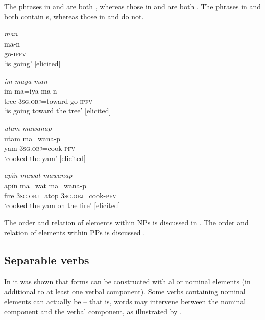 The phrases in  and  are both , whereas those in  and  are both . The phrases in  and  both contain s, whereas those in  and  do not.

\ea%
    \label{ex:phrase:41}
          \textit{man}\\
\gll    ma-n\\
    go-\textsc{ipfv}\\
\glt `is going’ [elicited]
\z

\ea%
    \label{ex:phrase:42}
          \textit{im maya man}\\
\gll    im    ma=iya      ma-n\\
    tree  3\textsc{sg.obj}=toward  go-\textsc{ipfv}\\
\glt `is going toward the tree’ [elicited]
\z


\ea%
    \label{ex:phrase:43}
          \textit{utam mawanap}\\
\gll    utam  ma=wana-p\\
    yam  \textsc{3sg.obj}=cook-\textsc{pfv}\\
\glt `cooked the yam’ [elicited]
\z

\ea%
    \label{ex:phrase:44}
          \textit{apïn mawat mawanap}\\
\gll    apïn  ma=wat    ma=wana-p\\
    fire    3\textsc{sg.obj}=atop  3\textsc{sg.obj}=cook-\textsc{pfv}\\
\glt `cooked the yam on the fire’ [elicited]
\z

The order and relation of elements within NPs is discussed in . The order and relation of elements within PPs is discussed .


\subsection{Separable verbs}\label{sec:9.2.1}


In  it was shown that  forms can be constructed with al or nominal elements (in additional to at least one verbal component). Some  verbs containing nominal elements can actually be  -- that is, words may intervene between the nominal component and the verbal component, as illustrated by .

